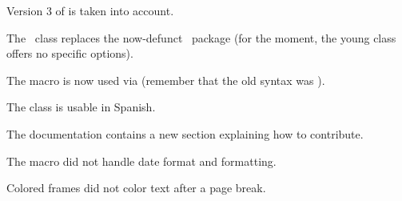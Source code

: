 \documentclass{tutodoc}
\begin{document}
\small

\begin{tdoctech}
    \item Version 3 of  is taken into account.
\end{tdoctech}


\begin{tdocbreak}
    \item The \thisproj\ class replaces the now-defunct \thisproj\ package (for the moment, the young class offers no specific options).

    \item The  macro is now used via  (remember that the old syntax was ).
\end{tdocbreak}


\begin{tdocnew}
    \item The class is usable in Spanish.

    \item The documentation contains a new section explaining how to contribute.
\end{tdocnew}


\begin{tdocfix}
    \item The  macro did not handle date format and formatting.

    \item Colored frames did not color text after a page break.
\end{tdocfix}
\end{document}
